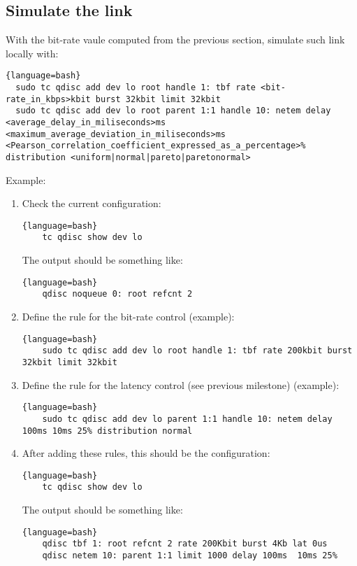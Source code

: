 \subsection{Simulate the link}

With the bit-rate vaule computed from the previous section, simulate
such link locally with:

\begin{lstlisting}{language=bash}
  sudo tc qdisc add dev lo root handle 1: tbf rate <bit-rate_in_kbps>kbit burst 32kbit limit 32kbit
  sudo tc qdisc add dev lo root parent 1:1 handle 10: netem delay <average_delay_in_miliseconds>ms <maximum_average_deviation_in_miliseconds>ms <Pearson_correlation_coefficient_expressed_as_a_percentage>% distribution <uniform|normal|pareto|paretonormal>
\end{lstlisting}

Example:

\begin{enumerate}
\item Check the current configuration:
  
  \begin{lstlisting}{language=bash}
    tc qdisc show dev lo
  \end{lstlisting}
  
  The output should be something like:
  
  \begin{lstlisting}{language=bash}
    qdisc noqueue 0: root refcnt 2
  \end{lstlisting}
  
\item Define the rule for the bit-rate control (example):
  
  \begin{lstlisting}{language=bash}
    sudo tc qdisc add dev lo root handle 1: tbf rate 200kbit burst 32kbit limit 32kbit
  \end{lstlisting}
  
\item Define the rule for the latency control (see previous milestone) (example):
  
  \begin{lstlisting}{language=bash}
    sudo tc qdisc add dev lo parent 1:1 handle 10: netem delay 100ms 10ms 25% distribution normal
  \end{lstlisting}
  
\item After adding these rules, this should be the configuration:
  
  \begin{lstlisting}{language=bash}
    tc qdisc show dev lo
  \end{lstlisting}
  
  The output should be something like:
  
  \begin{lstlisting}{language=bash}
    qdisc tbf 1: root refcnt 2 rate 200Kbit burst 4Kb lat 0us 
    qdisc netem 10: parent 1:1 limit 1000 delay 100ms  10ms 25%
  \end{lstlisting}

\end{enumerate}

